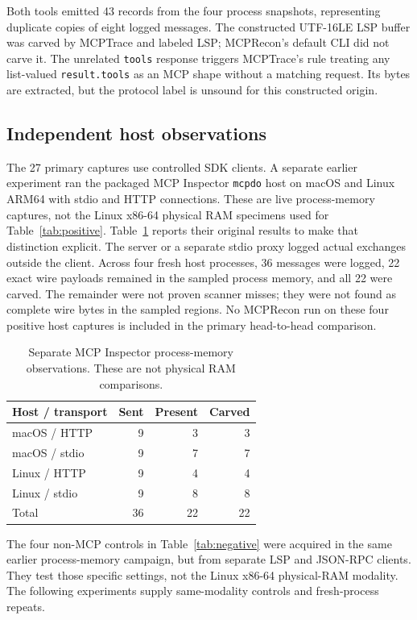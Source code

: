 \documentclass[conference,10pt]{IEEEtran}
\begin{document}
Both tools emitted 43 records from the four process snapshots, representing duplicate copies of eight logged messages. The constructed UTF-16LE LSP buffer was carved by MCPTrace and labeled LSP; MCPRecon's default CLI did not carve it. The unrelated \texttt{tools} response triggers MCPTrace's rule treating any list-valued \texttt{result.tools} as an MCP shape without a matching request. Its bytes are extracted, but the protocol label is unsound for this constructed origin.

\subsection{Independent host observations}
The 27 primary captures use controlled SDK clients. A separate earlier experiment ran the packaged MCP Inspector \texttt{mcpdo} host on macOS and Linux ARM64 with stdio and HTTP connections. These are live process-memory captures, not the Linux x86-64 physical RAM specimens used for Table~\ref{tab:positive}. Table~\ref{tab:inspector} reports their original results to make that distinction explicit. The server or a separate stdio proxy logged actual exchanges outside the client. Across four fresh host processes, 36 messages were logged, 22 exact wire payloads remained in the sampled process memory, and all 22 were carved. The remainder were not proven scanner misses; they were not found as complete wire bytes in the sampled regions. No MCPRecon run on these four positive host captures is included in the primary head-to-head comparison.

\begin{table}[t]
\caption{Separate MCP Inspector process-memory observations. These are not physical RAM comparisons.}
\label{tab:inspector}
\centering
\footnotesize
\setlength{\tabcolsep}{4pt}
\begin{tabular}{lrrr}
\toprule
Host / transport & Sent & Present & Carved \\
\midrule
macOS / HTTP & 9 & 3 & 3 \\
macOS / stdio & 9 & 7 & 7 \\
Linux / HTTP & 9 & 4 & 4 \\
Linux / stdio & 9 & 8 & 8 \\
\midrule
Total & 36 & 22 & 22 \\
\bottomrule
\end{tabular}
\end{table}

The four non-MCP controls in Table~\ref{tab:negative} were acquired in the same earlier process-memory campaign, but from separate LSP and JSON-RPC clients. They test those specific settings, not the Linux x86-64 physical-RAM modality. The following experiments supply same-modality controls and fresh-process repeats.
\end{document}
